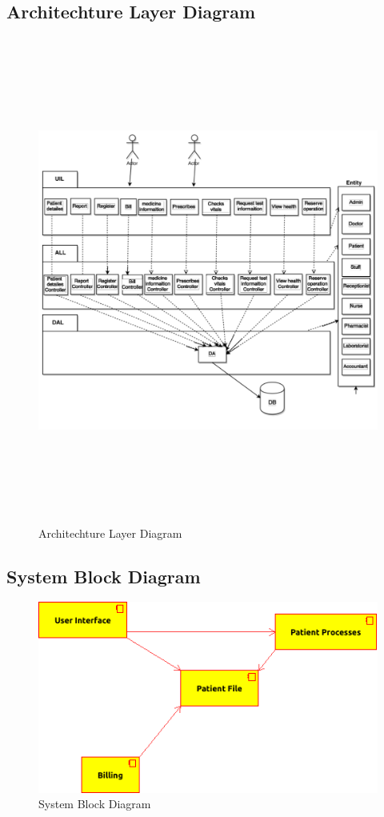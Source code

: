 \documentclass[14pt]{article}
\begin{document}
	\subsection{Architechture Layer Diagram}
		\begin{figure}[h!]
			\centering 
			\caption{Architechture Layer Diagram}
			\includegraphics[height=16cm,keepaspectratio]{LayeredArchitechtureDiagram.pdf}
		\end{figure}
\newpage
	\subsection{System Block Diagram}
		\begin{figure}[h!]
			\centering 
			\caption{System Block Diagram}
			\includegraphics[width=\textwidth,keepaspectratio]{SystemBlockDiagram.png}
	\end{figure}
\end{document}
